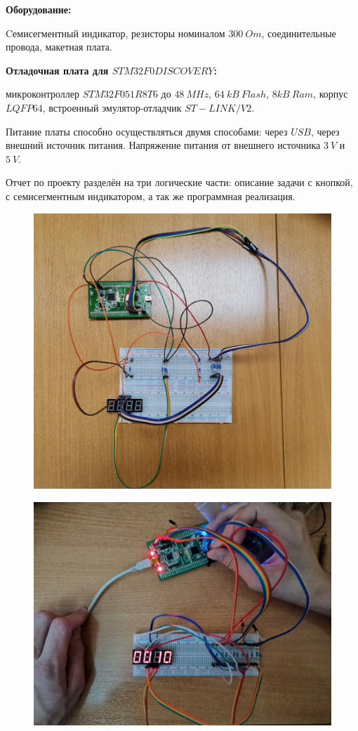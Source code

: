 \documentclass[15pt,a5paper,reqno]{article}
\begin{document}
\textbf{Оборудование:}

Cемисегментный индикатор, резисторы номиналом $300 \: Om$, соединительные провода, макетная плата.

\textbf{Отладочная плата для $STM32F0DISCOVERY$:}

микроконтроллер $STM32F051R8T6$ до $48 \: MHz$, $64 \: kB \: Flash$, $8 kB \: Ram$, корпус $LQFP64$, встроенный эмулятор-отладчик $ST-LINK/V2$.

Питание платы способно осуществляться двумя способами: через $USB$, через внешний источник питания. Напряжение питания от внешнего источника $3 \: V$ и $5 \: V$.

Отчет по проекту разделён на три логические части: описание задачи с кнопкой, с семисегментным индикатором, а так же программная реализация.


\begin{figure}[h!]
		\centering
		\includegraphics[width=0.8\linewidth]{pics/photo_of_stm.png}
		\caption{}
		\label{stm}
\end{figure}

\begin{figure}[h!]
		\centering
		\includegraphics[width=0.8\linewidth]{pics/otl10.jpg}
		\caption{}
		\label{otl10}
\end{figure}
\end{document}
